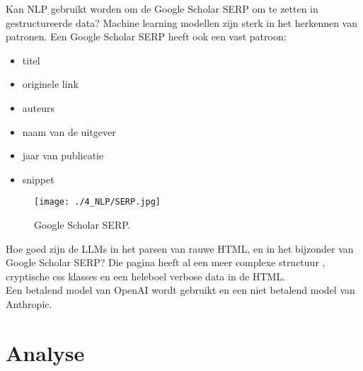 Kan NLP gebruikt worden om de Google Scholar SERP om te zetten in gestructureerde data? Machine learning modellen zijn sterk in het herkennen van patronen. Een Google Scholar SERP heeft ook een vast patroon:
\begin{itemize}
    \item titel
    \item originele link
    \item auteurs
    \item naam van de uitgever
    \item jaar van publicatie
    \item snippet
\end{itemize}
\begin{figure}
    \centering
    \texttt{[image: ./4\_NLP/SERP.jpg]}
    \caption[Google Scholar SERP.]{\label{fig:Google ScholarSERP}Google Scholar SERP.}
\end{figure}
Hoe goed zijn de LLMs in het parsen van rauwe HTML, en in het bijzonder van Google Scholar SERP? Die pagina heeft al een meer complexe structuur , cryptische css klasses en een heleboel verbose data in de HTML.\\
Een betalend model van OpenAI wordt gebruikt en een niet betalend model van Anthropic.
\section{Analyse}
\lipsum[1-2]
